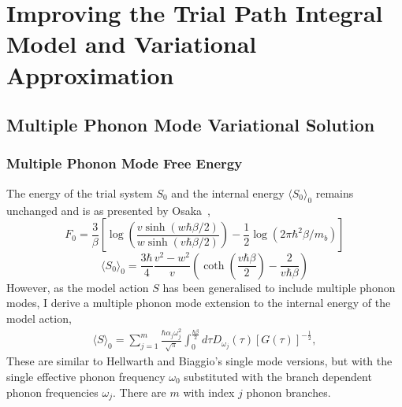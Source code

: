 \chapter{Improving the Trial Path Integral Model and Variational Approximation}
\label{chap:fourth}



\section{Multiple Phonon Mode Variational Solution}

\subsection{Multiple Phonon Mode Free Energy}
\label{subsec:3-1-2}

The energy of the trial system $S_0$ and the internal energy $\langle S_0 \rangle_0$ remains unchanged and is as presented by Osaka~\cite{osaka_polaron_1959},
\begin{equation}
    F_0 = \frac{3}{\beta} \left[\log\left(\frac{v \sinh (w \hbar \beta / 2)}{w \sinh (v \hbar \beta / 2)}\right) - \frac{1}{2} \log \left(2\pi\hbar^2 \beta / m_b \right) \right]
\end{equation}
\begin{equation}
    \langle S_0 \rangle_0 = \frac{3\hbar}{4}\frac{v^2-w^2}{v} \left( \coth \left( \frac{v \hbar \beta}{2} \right) - \frac{2}{v \hbar \beta} \right)
\end{equation}
However, as the model action $S$ has been generalised to include multiple phonon modes, I derive a multiple phonon mode extension to the internal energy of the model action, 
\begin{equation}
\begin{gathered}
    \langle S \rangle_0 = \sum _{j=1}^m \frac{\hbar \alpha_j \omega_j^2}{\sqrt{\pi}} \int_0^{\frac{\hbar\beta}{2}} d\tau D_{\omega_j}(\tau) \left[ G(\tau) \right]^{-\frac{1}{2}} ,
\label{eqn:B}
\end{gathered}
\end{equation}
These are similar to Hellwarth and Biaggio's single mode versions, but with the single effective phonon frequency $\omega_0$ substituted with the branch dependent phonon frequencies $\omega_j$. There are $m$ with index $j$ phonon branches.

